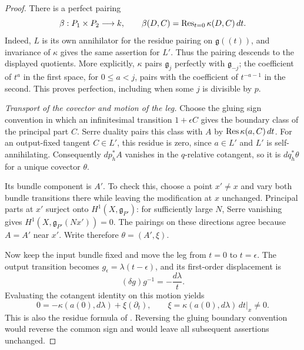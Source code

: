 \begin{proof}
There is a perfect pairing
\begin{equation}\label{hecke:residue-pairing}
 \beta:P_1\times P_2\longrightarrow k,
 \qquad \beta(D,C)=\operatorname{Res}_{t=0}\kappa(D,C)\,dt.
\end{equation}
Indeed, $L$ is its own annihilator for the residue pairing on
$\mathfrak g((t))$, and invariance of $\kappa$ gives the same assertion
for $L'$.  Thus the pairing descends to the displayed quotients.
More explicitly, $\kappa$ pairs $\mathfrak g_j$ perfectly with
$\mathfrak g_{-j}$; the coefficient of $t^a$ in the first space, for
$0\le a<j$, pairs with the coefficient of $t^{-a-1}$ in the second.
This proves perfection, including when some $j$ is divisible by $p$.

\smallskip\noindent
\emph{Transport of the covector and motion of the leg.}
Choose the gluing sign convention in which an infinitesimal transition
$1+\epsilon C$ gives the boundary class of the principal part $C$.
Serre duality pairs this class with $A$ by
$\operatorname{Res}\kappa(a,C)\,dt$.  For an output-fixed tangent $C\in L'$, this
residue is zero, since $a\in L'$ and $L'$ is self-annihilating.
Consequently $dp_h^*A$ vanishes in the $q$-relative cotangent, so it is
$dq_h^*\theta$ for a unique covector $\theta$.

Its bundle component is $A'$.  To check this, choose a point $x'\ne x$
and vary both bundle transitions there while leaving the modification
at $x$ unchanged.  Principal parts at $x'$ surject onto
$H^1(X,\mathfrak g_{P'})$: for sufficiently large $N$, Serre vanishing
gives $H^1(X,\mathfrak g_{P'}(Nx'))=0$.  The pairings on these
directions agree because $A=A'$ near $x'$.  Write therefore
$\theta=(A',\xi)$.

Now keep the input bundle fixed and move the leg from $t=0$ to
$t=\epsilon$.  The output transition becomes $g_\epsilon=\lambda(t-\epsilon)$,
and its first-order displacement is
\[
 (\delta g)g^{-1}=-\frac{d\lambda}{t}.
\]
Evaluating the cotangent identity on this motion yields
\[
 0=-\kappa(a(0),d\lambda)+\xi(\partial_t),
 \qquad
 \xi=\kappa(a(0),d\lambda)\,dt\big|_x\ne0.
\]
This is also the residue formula of
\cite[Equation~(20.20)]{AGKRRV}.  Reversing the gluing boundary convention
would reverse the common sign and would leave all subsequent assertions
unchanged.


\end{proof}
